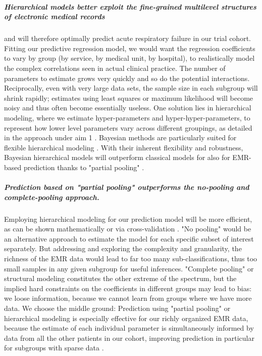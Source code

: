 \documentclass[11pt,notitlepage]{article}
\begin{document}
\subparagraph*{Hierarchical models better exploit the fine-grained multilevel structures of electronic medical records} and will therefore optimally predict acute respiratory failure in our trial cohort. Fitting our predictive regression model, we would want the regression coefficients to vary by group (by service, by medical unit, by hospital), to realistically model the complex correlations seen in actual clinical practice. The number of parameters to estimate grows very quickly and so do the potential interactions. Reciprocally, even with very large data sets, the sample size in each subgroup will shrink rapidly; estimates using least squares or maximum likelihood will become noisy and thus often become essentially useless. One solution lies in hierarchical modeling, where we estimate hyper-parameters and hyper-hyper-parameters, to represent how lower level parameters vary across different groupings, as detailed in the approach under aim 1 \cite{Bafumi_Gelman_2007}. Bayesian methods are particularly suited for flexible hierarchical modeling \cite{Carlin_1349763,Sutton_2012}. With their inherent flexibility and robustness, Bayesian hierarchical models will outperform classical models for also for EMR- based prediction thanks to "partial pooling" \cite{Gelman_red_2009}.  

\subparagraph*{Prediction based on "partial pooling" outperforms the no-pooling and complete-pooling approach.}
Employing hierarchical modeling for our prediction model will be more efficient, as can be shown mathematically or via cross-validation \cite{Gelman-Hill_2014}. "No pooling" would be an alternative approach to estimate the model for each specific subset of interest separately. But addressing and exploring the complexity and granularity, the richness of the EMR data would lead to far too many sub-classifications, thus too small samples in any given subgroup for useful inferences. "Complete pooling" or structural modeling constitutes the other extreme of the spectrum, but the implied hard constraints on the coefficients in different groups may lead to bias: we loose information, because we cannot learn from groups where we have more data. We choose the middle ground: Prediction using "partial pooling" or hierarchical modeling is especially effective for our richly organized EMR data, because the estimate of each individual parameter is simultaneously informed by data from all the other patients in our cohort, improving prediction in particular for subgroups with sparse data \cite{Gelman_multilevel_2006}. \newline
\end{document}
